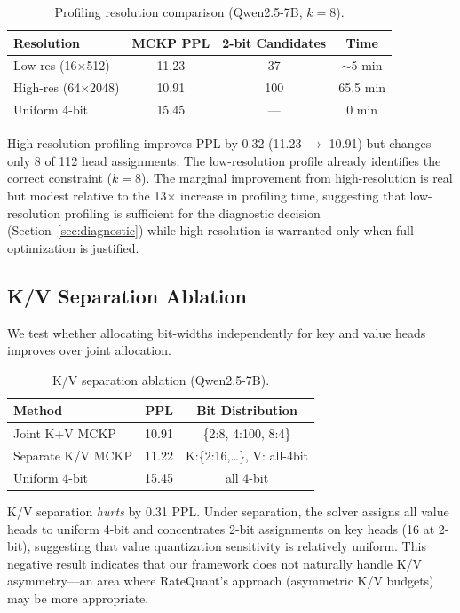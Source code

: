 \documentclass[11pt,a4paper]{article}
\begin{document}
\begin{table}[h]
\centering
\caption{Profiling resolution comparison (Qwen2.5-7B, $k\!=\!8$).}
\label{tab:profiling}
\small
\begin{tabular}{lccc}
\toprule
Resolution & MCKP PPL & 2-bit Candidates & Time \\
\midrule
Low-res (16$\times$512) & 11.23 & 37 & $\sim$5 min \\
High-res (64$\times$2048) & 10.91 & 100 & 65.5 min \\
Uniform 4-bit & 15.45 & --- & 0 min \\
\bottomrule
\end{tabular}
\end{table}

High-resolution profiling improves PPL by 0.32 (11.23 $\to$ 10.91) but changes only 8 of 112 head assignments.
The low-resolution profile already identifies the correct constraint ($k\!=\!8$).
The marginal improvement from high-resolution is real but modest relative to the 13$\times$ increase in profiling time, suggesting that low-resolution profiling is sufficient for the diagnostic decision (Section~\ref{sec:diagnostic}) while high-resolution is warranted only when full optimization is justified.

\subsection{K/V Separation Ablation}

We test whether allocating bit-widths independently for key and value heads improves over joint allocation.

\begin{table}[h]
\centering
\caption{K/V separation ablation (Qwen2.5-7B).}
\label{tab:kv_sep}
\small
\begin{tabular}{lcc}
\toprule
Method & PPL & Bit Distribution \\
\midrule
Joint K+V MCKP & 10.91 & \{2:8, 4:100, 8:4\} \\
Separate K/V MCKP & 11.22 & K:\{2:16,\ldots\}, V: all-4bit \\
Uniform 4-bit & 15.45 & all 4-bit \\
\bottomrule
\end{tabular}
\end{table}

K/V separation \emph{hurts} by 0.31 PPL.
Under separation, the solver assigns all value heads to uniform 4-bit and concentrates 2-bit assignments on key heads (16 at 2-bit), suggesting that value quantization sensitivity is relatively uniform.
This negative result indicates that our framework does not naturally handle K/V asymmetry---an area where RateQuant's approach (asymmetric K/V budgets) may be more appropriate.
\end{document}
